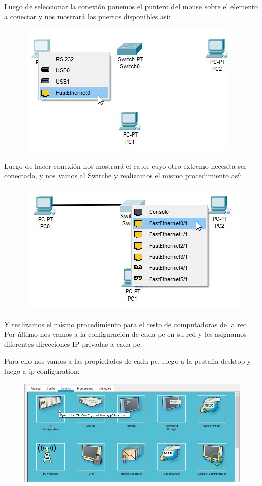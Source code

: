 \documentclass[journal]{IEEEtran}
\begin{document}
Luego de seleccionar la conexión ponemos el puntero del mouse sobre el elemento a conectar y nos mostrará los puertos disponibles así:

\begin{figure}[ht]
	\centering
	\includegraphics[scale=0.5]{pt_connectionpc.jpg}
\end{figure}

Luego de hacer conexión nos mostrará el cable cuyo otro extremo necesita ser conectado, y nos vamos al Switche y realizamos el mismo procedimiento así:

\begin{figure}[ht]
	\centering
	\includegraphics[scale=0.5]{pt_connectionswitch.jpg}
\end{figure}

Y realizamos el mismo procedimiento para el resto de computadoras de la red.
\newline \newline
Por último nos vamos a la configuración de cada pc en su red y les asignamos diferentes direcciones IP privadas a cada pc.

\newpage

Para ello nos vamos a las propiedades de cada pc, luego a la pestaña desktop y luego a ip configuration:

\begin{figure}[ht]
	\centering
	\includegraphics[scale=0.3]{pt_menuip.jpg}
\end{figure}
\end{document}
